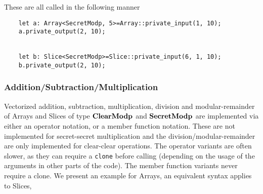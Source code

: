 These are all called in the following manner
\begin{lstlisting}
    let a: Array<SecretModp, 5>=Array::private_input(1, 10);
    a.private_output(2, 10);


    let b: Slice<SecretModp>=Slice::private_input(6, 1, 10);
    b.private_output(2, 10);
\end{lstlisting}

\subsubsection{Addition/Subtraction/Multiplication}
Vectorized addition, subtraction, multiplication, division and modular-remainder
of Arrays and Slices of type $\mathbf{ClearModp}$ and $\mathbf{SecretModp}$ 
are implemented via either an operator notation, or a member function notation.
These are not implemented for secret-secret multiplication and the 
division/modular-remainder are only implemented for clear-clear operations.
The operator variants are often slower, as they can require a \verb|clone|
before calling (depending on the usage of the arguments in other parts of
the code).
The member function variants never require a clone.
We present an example for Arrays, an equivalent syntax applies to Slices,
